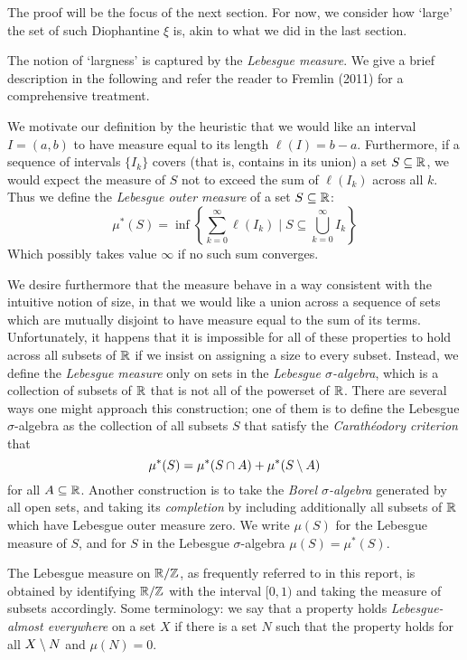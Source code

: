 \documentclass[../main.tex]{subfiles}
\begin{document}
The proof will be the focus of the next section. For now, we consider how `large' the set of such Diophantine $\xi$ is, akin to what we did in the last section.


The notion of `largness' is captured by the \emph{Lebesgue measure}. We give a brief description in the following and refer the reader to Fremlin (2011) for a comprehensive treatment.

We motivate our definition by the heuristic that we would like an interval $I = (a, b)$ to have measure equal to its length $\ell(I) = b - a$. Furthermore, if a sequence of intervals $\{ I_k \}$ covers (that is, contains in its union) a set $S \subseteq \mathbb{R}$, we would expect the measure of $S$ not to exceed the sum of $\ell(I_k)$ across all $k$. Thus we define the \emph{Lebesgue outer measure} of a set $S \subseteq \mathbb{R}$:
\[
\mu^\ast (S) = \inf \left\{ \sum_{k=0}^\infty \ell(I_k)
\mid S \subseteq \bigcup_{k=0}^\infty I_k\right\}
\]
Which possibly takes value $\infty$ if no such sum converges.

We desire furthermore that the measure behave in a way consistent with the intuitive notion of size, in that we would like a union across a sequence of sets which are mutually disjoint to have measure equal to the sum of its terms. Unfortunately, it happens that it is impossible for all of these properties to hold across all subsets of $\mathbb{R}$ if we insist on assigning a size to every subset. Instead, we define the \emph{Lebesgue measure} only on sets in the \emph{Lebesgue $\sigma$-algebra}, which is a collection of subsets of $\mathbb{R}$ that is not all of the powerset of $\mathbb{R}$. There are several ways one might approach this construction; one of them is to define the Lebesgue $\sigma$-algebra as the collection of all subsets $S$ that satisfy the \emph{Carathéodory criterion} that
\[
\mu^\ast(S) = \mu^\ast(S \cap A) + \mu^\ast(S\setminus A)
\]
for all $A \subseteq \mathbb{R}$. Another construction is to take the \emph{Borel $\sigma$-algebra} generated by all open sets, and taking its \emph{completion} by including additionally all subsets of $\mathbb{R}$ which have Lebesgue outer measure zero. We write $\mu(S)$ for the Lebesgue measure of $S$, and for $S$ in the Lebesgue $\sigma$-algebra $\mu(S) = \mu^\ast(S)$.

The Lebesgue measure on $\mathbb{R}/\mathbb{Z}$, as frequently referred to in this report, is obtained by identifying $\mathbb{R}/\mathbb{Z}$ with the interval $[0, 1)$ and taking the measure of subsets accordingly. Some terminology: we say that a property holds \emph{Lebesgue-almost everywhere} on a set $X$ if there is a set $N$ such that the property holds for all $X\setminus N$ and $\mu(N) = 0$.
\end{document}
